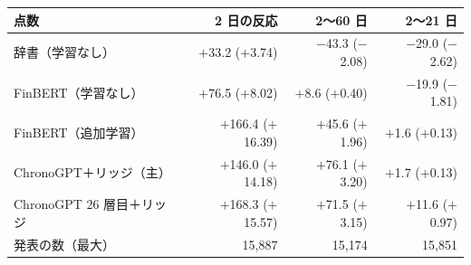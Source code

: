 \begin{tabular}{@{}lrrr@{}}
\toprule
点数 & 2 日の反応 & 2〜60 日 & 2〜21 日 \\
\midrule
辞書（学習なし） & $+$33.2 ($+$3.74) & $-$43.3 ($-$2.08) & $-$29.0 ($-$2.62) \\
FinBERT（学習なし） & $+$76.5 ($+$8.02) & $+$8.6 ($+$0.40) & $-$19.9 ($-$1.81) \\
FinBERT（追加学習） & $+$166.4 ($+$16.39) & $+$45.6 ($+$1.96) & $+$1.6 ($+$0.13) \\
ChronoGPT＋リッジ（主） & $+$146.0 ($+$14.18) & $+$76.1 ($+$3.20) & $+$1.7 ($+$0.13) \\
ChronoGPT 26 層目＋リッジ & $+$168.3 ($+$15.57) & $+$71.5 ($+$3.15) & $+$11.6 ($+$0.97) \\
\midrule
発表の数（最大） & 15,887 & 15,174 & 15,851 \\
\bottomrule
\end{tabular}
